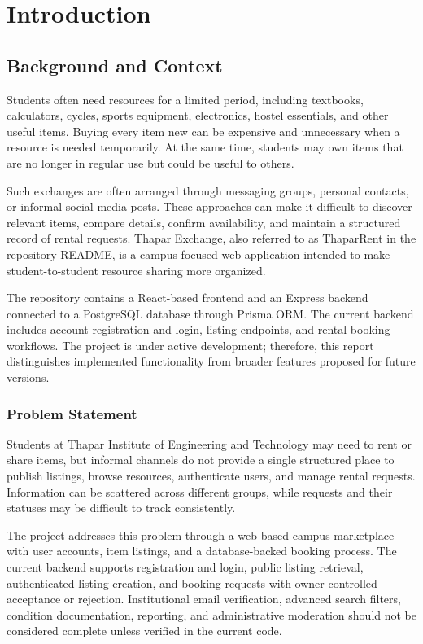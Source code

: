 \documentclass{tietreport}
\author{%
  \texttt{1024031005} Kanishk Khinchi \\
  \texttt{1024030290} Mahesh \\
  \texttt{1024030729} Amrita%
}
\begin{document}
\maketitle
\tableofcontents

\chapter{Introduction}
\section{Background and Context}
Students often need resources for a limited period, including textbooks, calculators, cycles, sports equipment, electronics, hostel essentials, and other useful items. Buying every item new can be expensive and unnecessary when a resource is needed temporarily. At the same time, students may own items that are no longer in regular use but could be useful to others.

Such exchanges are often arranged through messaging groups, personal contacts, or informal social media posts. These approaches can make it difficult to discover relevant items, compare details, confirm availability, and maintain a structured record of rental requests. Thapar Exchange, also referred to as ThaparRent in the repository README, is a campus-focused web application intended to make student-to-student resource sharing more organized.

The repository contains a React-based frontend and an Express backend connected to a PostgreSQL database through Prisma ORM. The current backend includes account registration and login, listing endpoints, and rental-booking workflows. The project is under active development; therefore, this report distinguishes implemented functionality from broader features proposed for future versions.

\subsection{Problem Statement}
Students at Thapar Institute of Engineering and Technology may need to rent or share items, but informal channels do not provide a single structured place to publish listings, browse resources, authenticate users, and manage rental requests. Information can be scattered across different groups, while requests and their statuses may be difficult to track consistently.

The project addresses this problem through a web-based campus marketplace with user accounts, item listings, and a database-backed booking process. The current backend supports registration and login, public listing retrieval, authenticated listing creation, and booking requests with owner-controlled acceptance or rejection. Institutional email verification, advanced search filters, condition documentation, reporting, and administrative moderation should not be considered complete unless verified in the current code.
\end{document}
